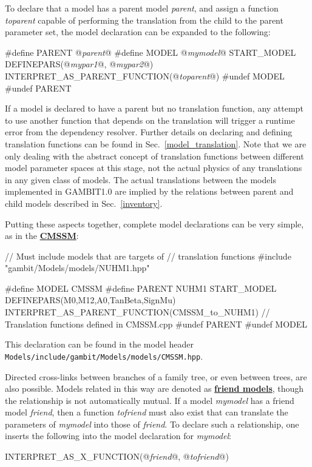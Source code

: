 \documentclass[pdftex,twocolumn,epjc3_preprint,runningheads]{svjour3}
\renewcommand{\_}{\discretionary{\underscore}{}{\underscore}}
\newcommand\term[1]{{\lstset{style=terminal}\lstinline!#1!\lstset{style=cpp}}}
\newcommand{\doublecross}[2]{\hyperref[#2]{\textbf{#1}}}
\newcommand{\doublecrosssf}[2]{\hyperref[#2]{\textbf{\textsf{#1}}}}
\newcommand{\metavarf}[1]{\textit{\color{darkgreen}\footnotesize\textrm{#1}}}
\newcommand{\metavar}{\metavarf}
\newcommand{\gambit}{\textsf{GAMBIT}\xspace}
\newcommand{\GB}{\gambit}
\begin{document}
To declare that a model has a parent model \mbox{\metavar{parent},} and assign a function \metavar{to\_parent} capable of performing the translation from the child to the parent parameter set, the model declaration can be expanded to the following:
\begin{lstcpp}
#define PARENT @\metavar{parent}@
  #define MODEL @\metavar{my\_model}@
  START_MODEL
  DEFINEPARS(@\metavar{my\_par1}@, @\metavar{my\_par2}@)
  INTERPRET_AS_PARENT_FUNCTION(@\metavar{to\_parent}@)
  #undef MODEL
#undef PARENT
\end{lstcpp}
If a model is declared to have a parent but no translation function, any attempt to use another function that depends on the translation will trigger a runtime error from the dependency resolver. Further details on declaring and defining translation functions can be found in Sec.~\ref{model_translation}.  Note that we are only dealing with the abstract concept of translation functions between different model parameter spaces at this stage, not the actual physics of any translations in any given class of models. The actual translations between the models implemented in \GB \textsf{1.0} are implied by the relations between parent and child models described in Sec.\ \ref{inventory}.

Putting these aspects together, complete model declarations can be very simple, as in the \doublecrosssf{CMSSM}{CMSSM}:
\begin{lstcpp}
// Must include models that are targets of
// translation functions
#include "gambit/Models/models/NUHM1.hpp"

#define MODEL CMSSM
#define PARENT NUHM1
  START_MODEL
  DEFINEPARS(M0,M12,A0,TanBeta,SignMu)
  INTERPRET_AS_PARENT_FUNCTION(CMSSM_to_NUHM1)
  // Translation functions defined in CMSSM.cpp
#undef PARENT
#undef MODEL
\end{lstcpp}
This declaration can be found in the model header \term{Models/include/gambit/Models/models/CMSSM.hpp}.

Directed cross-links between branches of a family tree, or even between trees, are also possible. Models related in this way are denoted as \doublecross{friend models}{friend model}, though the relationship is not automatically mutual. If a model \metavar{my\_model} has a friend model \metavar{friend}, then a function \metavar{to\_friend} must also exist that can translate the parameters of \metavar{my\_model} into those of \metavar{friend}. To declare such a relationship, one inserts the following into the model declaration for \metavar{my\_model}:
\begin{lstcpp}
INTERPRET_AS_X_FUNCTION(@\metavar{friend}@, @\metavar{to\_friend}@)
\end{lstcpp}
\end{document}
